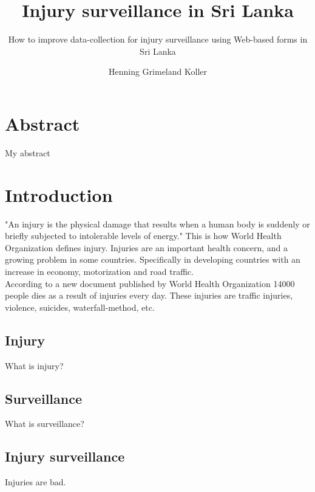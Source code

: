 \documentclass[UKenglish]{ifimaster}
\title{Injury surveillance in Sri Lanka}
\subtitle{How to improve data-collection for injury surveillance
using Web-based forms in Sri Lanka}
\author{Henning Grimeland Koller}
\newcommand{\WHO}{World Health Organization }
\begin{document}
\ififorside{}
\frontmatter{}
\maketitle{}

\chapter*{Abstract}
My abstract
\tableofcontents{}
\listoffigures{}
\listoftables{}
\mainmatter{}

\chapter*{Introduction}
"An injury is the physical damage that results when a human body is suddenly or briefly subjected to intolerable levels of energy."\cite[5]{who-guide}
This is how \WHO defines injury. Injuries are an important health concern, and a growing problem in some countries. Specifically in developing countries with an increase in economy, motorization and road traffic.
\\
According to a new document published by \WHO\cite{who-article} 14000 people dies as a result of injuries every day.
These injuries are traffic injuries, violence, suicides, waterfall-method, etc.
\section{Injury}
What is injury?
\section{Surveillance}
What is surveillance?
\section{Injury surveillance}
Injuries are bad. 
\end{document}
